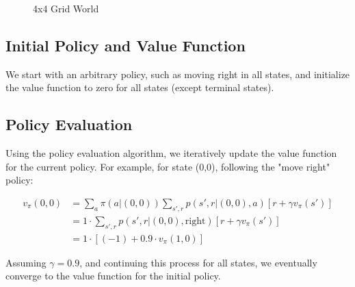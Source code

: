 \documentclass{article}
\begin{document}
\begin{figure}[h]
\centering
{}
\caption{4x4 Grid World}
\end{figure}

\subsection{Initial Policy and Value Function}

We start with an arbitrary policy, such as moving right in all states, and initialize the value function to zero for all states (except terminal states).

\subsection{Policy Evaluation}

Using the policy evaluation algorithm, we iteratively update the value function for the current policy. For example, for state (0,0), following the "move right" policy:

\begin{align*}
v_\pi(0,0) &= \sum_a \pi(a|(0,0)) \sum_{s',r} p(s',r|(0,0),a)[r + \gamma v_\pi(s')] \\
&= 1 \cdot \sum_{s',r} p(s',r|(0,0),\text{right})[r + \gamma v_\pi(s')] \\
&= 1 \cdot [(-1) + 0.9 \cdot v_\pi(1,0)]
\end{align*}

Assuming $\gamma = 0.9$, and continuing this process for all states, we eventually converge to the value function for the initial policy.
\end{document}
